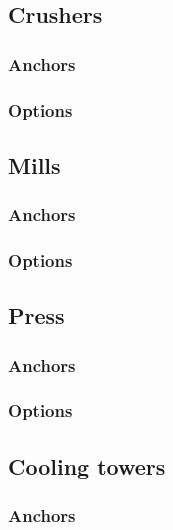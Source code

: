 \documentclass[a4paper, twoside]{article}
\begin{document}
    \subsection{Crushers}
        \subsubsection{Anchors}
            

        \subsubsection{Options}
            

    \subsection{Mills}
        \subsubsection{Anchors}
            

        \subsubsection{Options}
            

    \subsection{Press}
        \subsubsection{Anchors}
            

        \subsubsection{Options}
            

    \subsection{Cooling towers}
        \subsubsection{Anchors}
            
\end{document}
